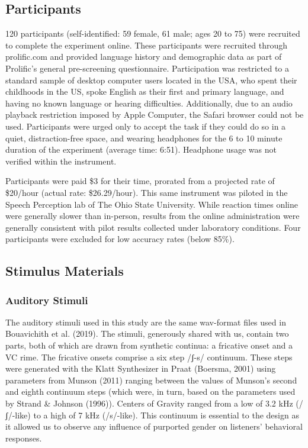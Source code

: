 \documentclass[
  letterpaper,
  DIV=11,
  numbers=noendperiod]{scrartcl}
\begin{document}
\subsection{Participants}\label{sec-participants}

120 participants (self-identified: 59 female, 61 male; ages 20 to 75)
were recruited to complete the experiment online. These participants
were recruited through prolific.com and provided language history and
demographic data as part of Prolific's general pre-screening
questionnaire. Participation was restricted to a standard sample of
desktop computer users located in the USA, who spent their childhoods in
the US, spoke English as their first and primary language, and having no
known language or hearing difficulties. Additionally, due to an audio
playback restriction imposed by Apple Computer, the Safari browser could
not be used. Participants were urged only to accept the task if they
could do so in a quiet, distraction-free space, and wearing headphones
for the 6 to 10 minute duration of the experiment (average time: 6:51).
Headphone usage was not verified within the instrument.

Participants were paid \$3 for their time, prorated from a projected
rate of \$20/hour (actual rate: \$26.29/hour). This same instrument was
piloted in the Speech Perception lab of The Ohio State University. While
reaction times online were generally slower than in-person, results from
the online administration were generally consistent with pilot results
collected under laboratory conditions. Four participants were excluded
for low accuracy rates (below 85\%).

\subsection{Stimulus Materials}\label{sec-stimuli}

\subsubsection{Auditory Stimuli}\label{sec-stimuli-auditory}

The auditory stimuli used in this study are the same wav-format files
used in Bouavichith et al. (2019). The stimuli, generously shared with
us, contain two parts, both of which are drawn from synthetic continua:
a fricative onset and a VC rime. The fricative onsets comprise a six
step /ʃ-s/ continuum. These steps were generated with the Klatt
Synthesizer in Praat (Boersma, 2001) using parameters from Munson (2011)
ranging between the values of Munson's second and eighth continuum steps
(which were, in turn, based on the parameters used by Strand \& Johnson
(1996)). Centers of Gravity ranged from a low of 3.2 kHz (/ʃ/-like) to a
high of 7 kHz (/s/-like). This continuum is essential to the design as
it allowed us to observe any influence of purported gender on listeners'
behavioral responses.
\end{document}
